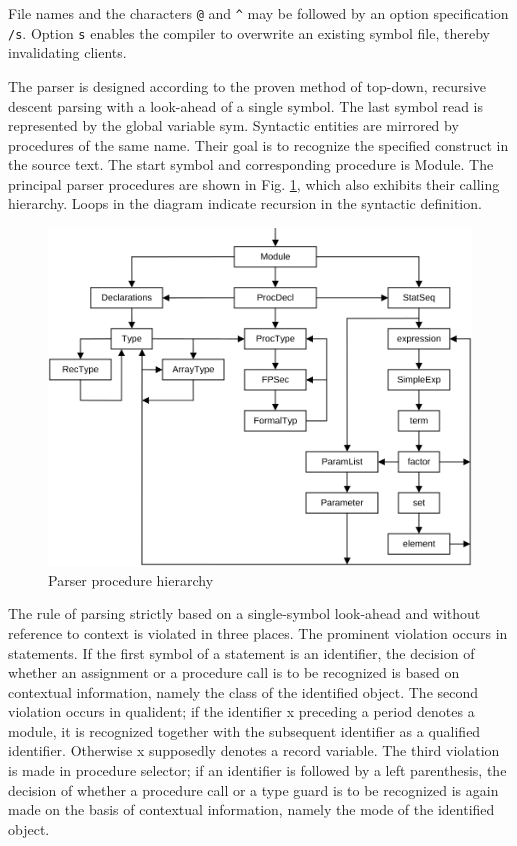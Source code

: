 File names and the characters \verb|@| and \verb|^| may be followed by an option specification
\verb|/s|. Option \verb|s| enables the compiler to overwrite an existing symbol file, thereby
invalidating clients.

The parser is designed according to the proven method of top-down, recursive descent parsing with
a look-ahead of a single symbol. The last symbol read is represented by the global variable sym.
Syntactic entities are mirrored by procedures of the same name. Their goal is to recognize the
specified construct in the source text. The start symbol and corresponding procedure is Module.
The principal parser procedures are shown in Fig. \ref{fig:pararch}, which also exhibits their calling
hierarchy.  Loops in the diagram indicate recursion in the syntactic definition.
\begin{figure}[h!]
  \centering
  \includegraphics[width=\textwidth]{i/C/6.png}
  \caption{Parser procedure hierarchy}
  \label{fig:pararch}
\end{figure}

The rule of parsing strictly based on a single-symbol look-ahead and without reference to context is
violated in three places. The prominent violation occurs in statements. If the first symbol of a
statement is an identifier, the decision of whether an assignment or a procedure call is to be
recognized is based on contextual information, namely the class of the identified object. The
second violation occurs in qualident; if the identifier x preceding a period denotes a module, it is
recognized together with the subsequent identifier as a qualified identifier. Otherwise x supposedly
denotes a record variable. The third violation is made in procedure selector; if an identifier is
followed by a left parenthesis, the decision of whether a procedure call or a type guard is to be
recognized is again made on the basis of contextual information, namely the mode of the identified
object.

